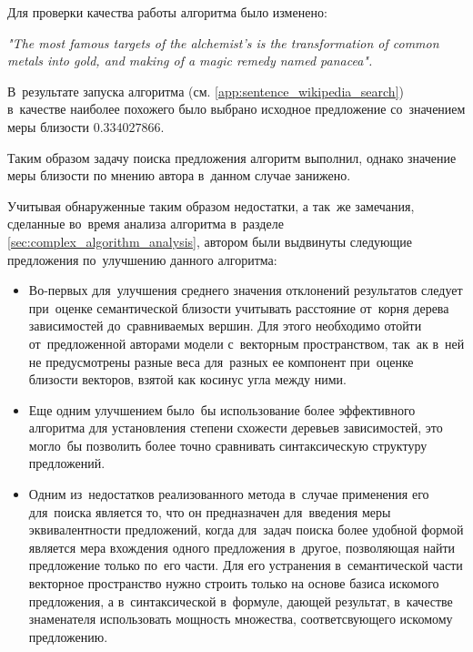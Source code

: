 Для проверки качества работы алгоритма было изменено:

\textit{"The most famous targets of the alchemist's is the transformation of common metals into gold, and making of a magic remedy named panacea".}

В~результате запуска алгоритма (см. \ref{app:sentence_wikipedia_search}) в~качестве наиболее похожего 
было выбрано исходное предложение со~значением меры близости $0.334027866$.

Таким образом задачу поиска предложения алгоритм выполнил, однако значение меры близости
по мнению автора в~данном случае занижено.

Учитывая обнаруженные таким образом недостатки, а так~же замечания, 
сделанные во~время анализа алгоритма в~разделе \ref{sec:complex_algorithm_analysis}, автором были
выдвинуты следующие предложения по~улучшению данного алгоритма:
\begin{itemize}
\item{
Во-первых для~улучшения среднего значения отклонений результатов следует
при~оценке семантической близости учитывать расстояние от~корня дерева зависимостей
до~сравниваемых вершин. Для этого необходимо отойти от~предложенной авторами модели с~векторным пространством,
так~ак в~ней не предусмотрены разные веса для~разных ее компонент при~оценке близости векторов, взятой как косинус угла между ними.
}
\item{
Еще одним улучшением было~бы использование более эффективного алгоритма для установления
степени схожести деревьев зависимостей, это могло~бы позволить более точно сравнивать
синтаксическую структуру предложений. 
}
\item{
Одним из~недостатков реализованного метода в~случае применения его для~поиска 
является то, что он предназначен для~введения меры эквивалентности предложений, когда для~задач поиска
более удобной формой является мера вхождения одного предложения в~другое, позволяющая найти предложение только по~его части.
Для его устранения в~семантической части векторное пространство нужно строить только на основе базиса искомого предложения,
а в~синтаксической в~формуле, дающей результат, в~качестве знаменателя использовать мощность множества,
соответсвующего искомому предложению.
}
\end{itemize}


